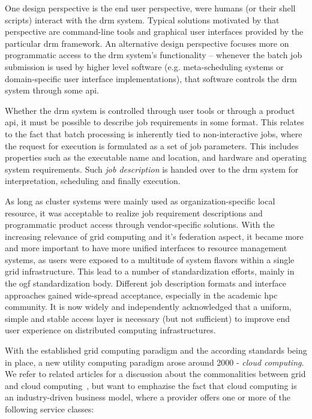 \documentclass[twocolumn]{svjour3}       %
\begin{document}
One design perspective is the end user perspective, were humans (or their shell scripts) interact with the \gls{drm} system. Typical solutions motivated by that perspective are command-line tools and graphical user interfaces provided by the particular \gls{drm} framework. An alternative design perspective focuses more on programmatic access to the \gls{drm} system's functionality -- whenever the batch job submission is used by higher level software (e.g. meta-scheduling systems or domain-specific user interface implementations), that software controls the \gls{drm} system through some \gls{api}.

Whether the \gls{drm} system is controlled through user tools or through a product \gls{api}, it must be possible to describe job requirements in some format. This relates to the fact that batch processing is inherently tied to non-interactive jobs, where the request for execution is formulated as a set of job parameters. This includes properties such as the executable name and location, and hardware and operating system requirements. Such \emph{job description} is handed over to the \gls{drm} system for interpretation, scheduling and finally execution. 

As long as cluster systems were mainly used as organization-specific local resource, it was acceptable to realize job requirement descriptions and programmatic product access through vendor-specific solutions. With the increasing relevance of grid computing and it's federation aspect, it became more and more important to have more unified interfaces to resource management systems, as users were exposed to a multitude of system flavors within a single grid infrastructure. This lead to a number of standardization efforts, mainly in the \gls{ogf} standardization body. Different job description formats and interface approaches gained wide-spread acceptance, especially in the academic \gls{hpc} community. It is now widely and independently acknowledged that a uniform, simple and stable access layer is necessary (but not sufficient) to improve end user experience on distributed computing infrastructures.

With the established grid computing paradigm and the according standards being in place, a new utility computing paradigm arose around 2000 - \emph{cloud computing}. We refer to related articles for a discussion about the commonalities between grid and cloud computing~\cite{citemaster_9642}, but want to emphazise the fact that cloud computing is an industry-driven business model, where a provider offers one or more of the following service classes:
\end{document}
